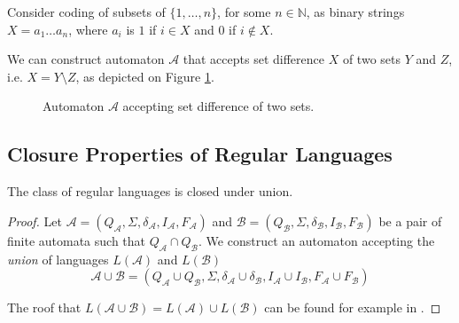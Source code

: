 	\noindent\hrulefill
	\begin{example}
	Consider coding of subsets of $\{1,\ldots,n\}$, for some $n \in \mathbb{N}$, as
	binary strings $X = a_1\ldots a_n$, where $a_i$ is $1$ if $i \in X$ and $0$ if
	$i \notin X$.
	
	We can construct automaton $\mathcal{A}$ that accepts set difference $X$ of two
	sets $Y$ and $Z$, i.e. $X = Y \setminus Z$, as depicted on Figure
	\ref{set-automaton}.
	
	\begin{figure}[h!]
	\begin{center}
	 \end{center}
	 \caption{Automaton $\mathcal{A}$ accepting set difference of two
	 sets.}\label{set-automaton}
	\end{figure}
	\end{example}
	
	\noindent\hrulefill
	
 \subsection{Closure Properties of Regular Languages}

\begin{theorem}
 The class of regular languages is closed under union.
\end{theorem}

\begin{proof}
Let $\mathcal{A} = (Q_\mathcal{A}, \Sigma, \delta_\mathcal{A}, I_\mathcal{A},
F_\mathcal{A})$ and $\mathcal{B} = (Q_\mathcal{B}, \Sigma, \delta_\mathcal{B},
I_\mathcal{B}, F_\mathcal{B})$ be a pair of finite automata such that
$Q_\mathcal{A} \cap Q_\mathcal{B}$. We construct an automaton accepting the
\emph{union} of languages $L(\mathcal{A})$ and $L(\mathcal{B})$  
 \begin{equation} \mathcal{A} \cup \mathcal{B} = (Q_\mathcal{A} \cup
 Q_\mathcal{B}, \Sigma, \delta_\mathcal{A} \cup \delta_\mathcal{B},
 I_\mathcal{A} \cup I_\mathcal{B}, F_\mathcal{A} \cup
F_\mathcal{B})
\end{equation}
	
The roof that $L(\mathcal{A} \cup \mathcal{B}) = L(\mathcal{A}) \cup
L(\mathcal{B})$ can be found for example in \cite{tin}.
\end{proof}

